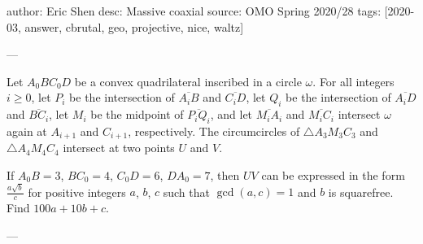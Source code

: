 author: Eric Shen
desc: Massive coaxial
source: OMO Spring 2020/28
tags: [2020-03, answer, cbrutal, geo, projective, nice, waltz]

---

Let $A_0BC_0D$ be a convex quadrilateral inscribed in a circle $\omega$. For all integers $i\ge0$, let $P_i$ be the intersection of $\overline{A_iB}$ and $\overline{C_iD}$, let $Q_i$ be the intersection of $\overline{A_iD}$ and $\overline{BC_i}$, let $M_i$ be the midpoint of $\overline{P_iQ_i}$, and let $\overline{M_iA_i}$ and $\overline{M_iC_i}$ intersect $\omega$ again at $A_{i+1}$ and $C_{i+1}$, respectively. The circumcircles of $\triangle A_3M_3C_3$ and $\triangle A_4M_4C_4$ intersect at two points $U$ and $V$.

If $A_0B=3$, $BC_0=4$, $C_0D=6$, $DA_0=7$, then $UV$ can be expressed in the form $\tfrac{a\sqrt b}c$ for positive integers $a$, $b$, $c$ such that $\gcd(a,c)=1$ and $b$ is squarefree. Find $100a+10b+c$.

---

